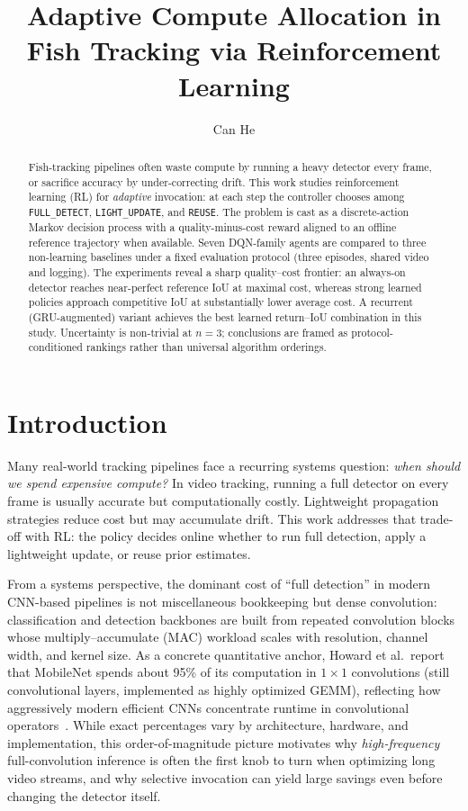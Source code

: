 \documentclass[letterpaper]{article}
\title{Adaptive Compute Allocation in Fish Tracking via Reinforcement Learning}
\author{Can He}
\date{}
\begin{document}
\maketitle

\begin{abstract}
Fish-tracking pipelines often waste compute by running a heavy detector every frame, or sacrifice accuracy by under-correcting drift. This work studies reinforcement learning (RL) for \emph{adaptive} invocation: at each step the controller chooses among \texttt{FULL\_DETECT}, \texttt{LIGHT\_UPDATE}, and \texttt{REUSE}. The problem is cast as a discrete-action Markov decision process with a quality-minus-cost reward aligned to an offline reference trajectory when available. Seven DQN-family agents are compared to three non-learning baselines under a fixed evaluation protocol (three episodes, shared video and logging). The experiments reveal a sharp quality--cost frontier: an always-on detector reaches near-perfect reference IoU at maximal cost, whereas strong learned policies approach competitive IoU at substantially lower average cost. A recurrent (GRU-augmented) variant achieves the best learned return--IoU combination in this study. Uncertainty is non-trivial at $n{=}3$; conclusions are framed as protocol-conditioned rankings rather than universal algorithm orderings.
\end{abstract}

\section{Introduction}
Many real-world tracking pipelines face a recurring systems question: \emph{when should we spend expensive compute?} In video tracking, running a full detector on every frame is usually accurate but computationally costly. Lightweight propagation strategies reduce cost but may accumulate drift. This work addresses that trade-off with RL: the policy decides online whether to run full detection, apply a lightweight update, or reuse prior estimates.

From a systems perspective, the dominant cost of ``full detection'' in modern CNN-based pipelines is not miscellaneous bookkeeping but dense convolution: classification and detection backbones are built from repeated convolution blocks whose multiply--accumulate (MAC) workload scales with resolution, channel width, and kernel size. As a concrete quantitative anchor, Howard et al.\ report that MobileNet spends about 95\% of its computation in $1\times1$ convolutions (still convolutional layers, implemented as highly optimized GEMM), reflecting how aggressively modern efficient CNNs concentrate runtime in convolutional operators~\cite{howard2017mobilenets}. While exact percentages vary by architecture, hardware, and implementation, this order-of-magnitude picture motivates why \emph{high-frequency} full-convolution inference is often the first knob to turn when optimizing long video streams, and why selective invocation can yield large savings even before changing the detector itself.
\end{document}
